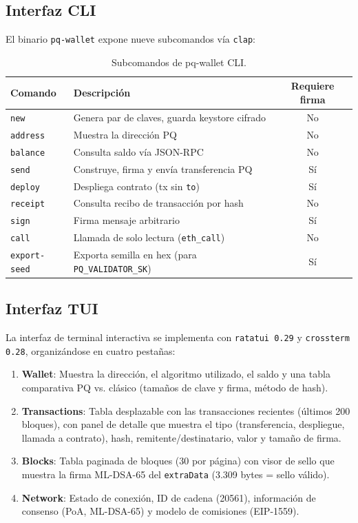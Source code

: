 \subsection{Interfaz CLI}

El binario \texttt{pq-wallet} expone nueve subcomandos vía \texttt{clap}:

\begin{table}[htbp]
\centering
\caption{Subcomandos de pq-wallet CLI.}
\label{tab:cli_commands}
\begin{tabular}{@{}llc@{}}
\toprule
\textbf{Comando} & \textbf{Descripción} & \textbf{Requiere firma} \\
\midrule
\texttt{new} & Genera par de claves, guarda keystore cifrado & No \\
\texttt{address} & Muestra la dirección PQ & No \\
\texttt{balance} & Consulta saldo vía JSON-RPC & No \\
\texttt{send} & Construye, firma y envía transferencia PQ & Sí \\
\texttt{deploy} & Despliega contrato (tx sin \texttt{to}) & Sí \\
\texttt{receipt} & Consulta recibo de transacción por hash & No \\
\texttt{sign} & Firma mensaje arbitrario & Sí \\
\texttt{call} & Llamada de solo lectura (\texttt{eth\_call}) & No \\
\texttt{export-seed} & Exporta semilla en hex (para \texttt{PQ\_VALIDATOR\_SK}) & Sí \\
\bottomrule
\end{tabular}
\end{table}

\subsection{Interfaz TUI}

La interfaz de terminal interactiva se implementa con \texttt{ratatui 0.29} y \texttt{crossterm 0.28}, organizándose en cuatro pestañas:

\begin{enumerate}
  \item \textbf{Wallet}: Muestra la dirección, el algoritmo utilizado, el saldo y una tabla comparativa PQ vs. clásico (tamaños de clave y firma, método de hash).
  
  \item \textbf{Transactions}: Tabla desplazable con las transacciones recientes (últimos 200 bloques), con panel de detalle que muestra el tipo (transferencia, despliegue, llamada a contrato), hash, remitente/destinatario, valor y tamaño de firma.
  
  \item \textbf{Blocks}: Tabla paginada de bloques (30 por página) con visor de sello que muestra la firma ML-DSA-65 del \texttt{extraData} (3.309 bytes = sello válido).
  
  \item \textbf{Network}: Estado de conexión, ID de cadena (20561), información de consenso (PoA, ML-DSA-65) y modelo de comisiones (EIP-1559).
\end{enumerate}

